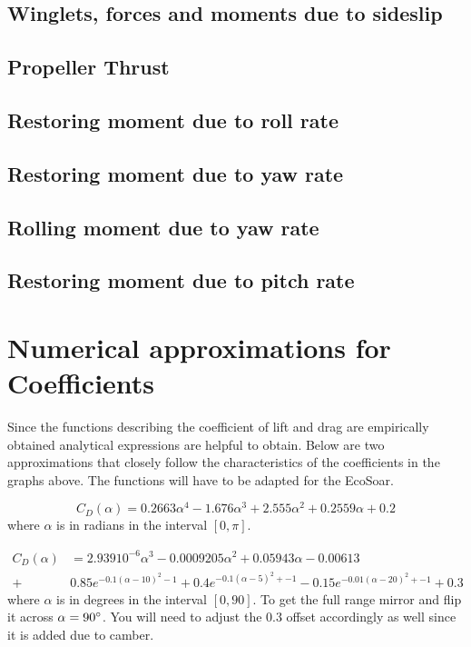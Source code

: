 \documentclass{article}
\begin{document}
\subsection{Winglets, forces and moments due to sideslip}


\subsection{Propeller Thrust}


\subsection{Restoring moment due to roll rate}


\subsection{Restoring moment due to yaw rate}


\subsection{Rolling moment due to yaw rate}


\subsection{Restoring moment due to pitch rate}








\section{Numerical approximations for Coefficients}
Since the functions describing the coefficient of lift and drag are empirically obtained analytical expressions are helpful to obtain.
Below are two approximations that closely follow the characteristics of the coefficients in the graphs above.
The functions will have to be adapted for the EcoSoar.

\begin{equation}
C_D(\alpha) = 0.2663 \alpha^4 -1.676 \alpha^3 + 2.555 \alpha^2 + 0.2559 \alpha + 0.2%
\end{equation}
where $\alpha$ is in radians in the interval $[0,\pi]$.

\begin{equation}\begin{split}
    C_D(\alpha) &= 2.939 10^{-6} \alpha^3 -0.0009205 \alpha^2 + 0.05943 \alpha -0.00613 \\
    +&
    0.85 e^{ -0.1 (\alpha - 10)^2 - 1 } + 0.4 e^{ -0.1 (\alpha - 5)^2 + -1 } - 0.15 e^{ -0.01 (\alpha - 20)^2 + -1 }
    + 0.3
\end{split}\end{equation}
where $\alpha$ is in degrees in the interval $[0,90]$.
To get the full range mirror and flip it across $\alpha = 90 \degree$.
You will need to adjust the $0.3$ offset accordingly as well since it is added due to camber.
\end{document}
